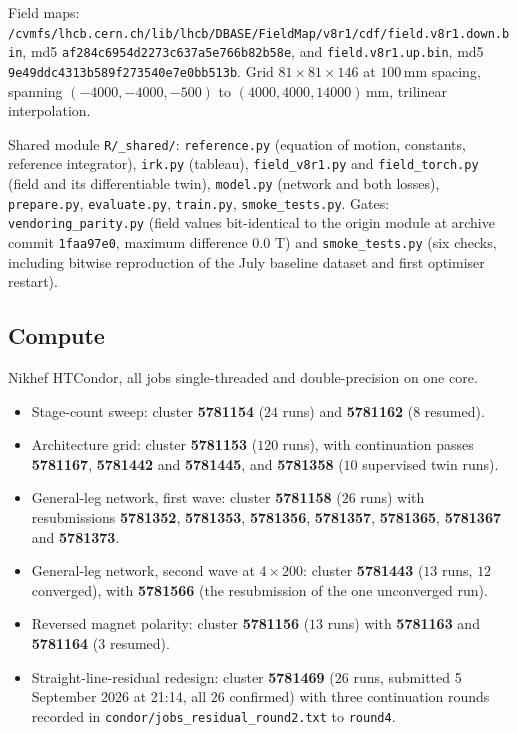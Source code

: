\documentclass[11pt,a4paper]{article}
\newcommand{\mm}{\ensuremath{\,\mathrm{mm}}}
\begin{document}
Field maps:
\texttt{/cvmfs/lhcb.cern.ch/lib/lhcb/}\allowbreak\texttt{DBASE/FieldMap/v8r1/cdf/}\allowbreak\texttt{field.v8r1.down.bin},
md5 \texttt{af284c6954d2273c637a5e766b82b58e}, and \texttt{field.v8r1.up.bin},
md5 \texttt{9e49ddc4313b589f273540e7e0bb513b}. Grid $81 \times 81 \times 146$ at
$100\mm$ spacing, spanning $(-4000, -4000, -500)$ to $(4000, 4000, 14000)\mm$,
trilinear interpolation.

Shared module \texttt{R/\_shared/}:
\texttt{reference.py} (equation of motion, constants, reference integrator),
\texttt{irk.py} (tableau), \texttt{field\_v8r1.py} and \texttt{field\_torch.py}
(field and its differentiable twin), \texttt{model.py} (network and both
losses), \texttt{prepare.py}, \texttt{evaluate.py}, \texttt{train.py},
\texttt{smoke\_tests.py}. Gates: \texttt{vendoring\_parity.py} (field values
bit-identical to the origin module at archive commit \texttt{1faa97e0}, maximum
difference $0.0$ T) and \texttt{smoke\_tests.py} (six checks, including bitwise
reproduction of the July baseline dataset and first optimiser restart).

\subsection*{Compute}

Nikhef HTCondor, all jobs single-threaded and double-precision on one core.

\begin{itemize}
  \item Stage-count sweep: cluster \textbf{5781154} ($24$ runs) and
  \textbf{5781162} ($8$ resumed).
  \item Architecture grid: cluster \textbf{5781153} ($120$ runs), with
  continuation passes \textbf{5781167}, \textbf{5781442} and \textbf{5781445},
  and \textbf{5781358} ($10$ supervised twin runs).
  \item General-leg network, first wave: cluster \textbf{5781158} ($26$ runs)
  with resubmissions \textbf{5781352}, \textbf{5781353}, \textbf{5781356},
  \textbf{5781357}, \textbf{5781365}, \textbf{5781367} and \textbf{5781373}.
  \item General-leg network, second wave at $4 \times 200$: cluster
  \textbf{5781443} ($13$ runs, $12$ converged), with \textbf{5781566} (the
  resubmission of the one unconverged run).
  \item Reversed magnet polarity: cluster \textbf{5781156} ($13$ runs) with
  \textbf{5781163} and \textbf{5781164} ($3$ resumed).
  \item Straight-line-residual redesign: cluster \textbf{5781469} ($26$ runs,
  submitted 5 September 2026 at 21:14, all $26$ confirmed) with three
  continuation rounds recorded in
  \texttt{condor/jobs\_residual\_round2.txt} to \texttt{round4}.
\end{itemize}
\end{document}
